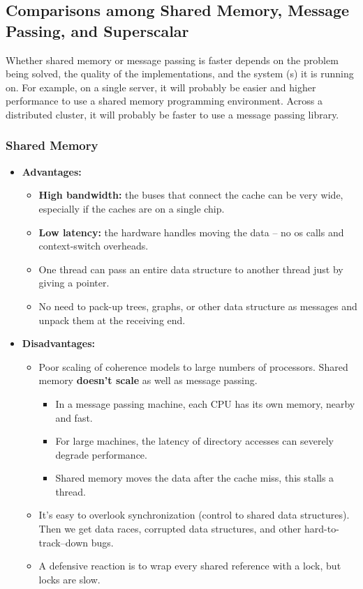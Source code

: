 \documentclass[../main.tex]{subfiles}
\begin{document}
\subsection{Comparisons among Shared Memory, Message Passing, and Superscalar}

Whether shared memory or message passing is faster depends on the problem being solved, the quality of the implementations, and the system (s) it is running on. For example, on a single server, it will probably be easier and higher performance to use a shared memory programming environment. Across a distributed cluster, it will probably be faster to use a message passing library.

\subsubsection{Shared Memory}

\begin{itemize}
	\item \textbf{Advantages:}
	      \begin{itemize}
		      \item \textbf{High bandwidth:} the buses that connect the cache can be very wide, especially if the caches are on a single chip.
		      \item \textbf{Low latency:} the hardware handles moving the data -- no os calls and context-switch overheads.
		      \item One thread can pass an entire data structure to another thread just by giving a pointer.
		      \item No need to pack-up trees, graphs, or other data structure as messages and unpack them at the receiving end.
	      \end{itemize}
	\item \textbf{Disadvantages:}
	      \begin{itemize}
		      \item   {
		            Poor scaling of coherence models to large numbers of processors.
		            Shared memory \textbf{doesn't scale} as well as message passing.
		            \begin{itemize}
			            \item In a message passing machine, each CPU has its own memory, nearby and fast.
			            \item For large machines, the latency of directory accesses can severely degrade performance.
			            \item Shared memory moves the data after the cache miss, this stalls a thread.
		            \end{itemize}
		            }
		      \item It's easy to overlook synchronization (control to shared data structures). Then we get data races, corrupted data structures, and other hard-to-track--down bugs.
		      \item A defensive reaction is to wrap every shared reference with a lock, but locks are slow.
	      \end{itemize}
\end{itemize}
\end{document}
